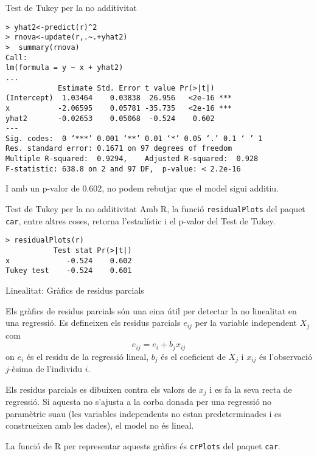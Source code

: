 \documentclass[12pt,t]{beamer}
\renewcommand{\emph}[1]{{\color{red}#1}}
\theoremstyle{plain}
\theoremstyle{definition}
\begin{document}
\begin{frame}[fragile]{Test de Tukey per la no additivitat}
\begin{footnotesize}


\begin{verbatim}
> yhat2<-predict(r)^2
> rnova<-update(r,.~.+yhat2)
>  summary(rnova)
Call:
lm(formula = y ~ x + yhat2)
...
            Estimate Std. Error t value Pr(>|t|)    
(Intercept)  1.03464    0.03838  26.956   <2e-16 ***
x           -2.06595    0.05781 -35.735   <2e-16 ***
yhat2       -0.02653    0.05068  -0.524    0.602    
---
Sig. codes:  0 ‘***’ 0.001 ‘**’ 0.01 ‘*’ 0.05 ‘.’ 0.1 ‘ ’ 1
Res. standard error: 0.1671 on 97 degrees of freedom
Multiple R-squared:  0.9294,	Adjusted R-squared:  0.928 
F-statistic: 638.8 on 2 and 97 DF,  p-value: < 2.2e-16
\end{verbatim}
\end{footnotesize}
I amb un p-valor de 0.602, no podem rebutjar que el model sigui additiu.
\end{frame}

\begin{frame}[fragile]{Test de Tukey per la no additivitat}
Amb R, la funció \texttt{residualPlots} del paquet \texttt{car}, entre altres coses, retorna l'estadístic i el p-valor del Test de Tukey.

\begin{verbatim}
> residualPlots(r)
           Test stat Pr(>|t|)
x             -0.524    0.602
Tukey test    -0.524    0.601
\end{verbatim}

\end{frame}

\begin{frame}{Linealitat: Gràfics de residus parcials}

Els gràfics de residus parcials són una eina útil per detectar la no linealitat en una regressió. Es defineixen els \emph{residus parcials} $e_{ij}$ per la variable independent $X_j$ com
$$e_{ij}=e_i+b_jx_{ij}$$
on $e_i$ és el residu de la regressió lineal, $b_j$ és el coeficient de $X_j$ i $x_{ij}$ és l'observació $j$-èsima de l'individu $i$. 

\vspace{0.25cm}

Els residus parcials es dibuixen contra els valors de $x_j$ i es fa la seva recta de regressió. Si aquesta no s'ajusta a la corba donada per una regressió no paramètric suau (les variables independents no estan predeterminades i es construeixen amb les dades), el model no és lineal. 

\medskip

La funció de R per representar aquests gràfics és \texttt{crPlots} del paquet \texttt{car}.

\end{frame}
\end{document}
